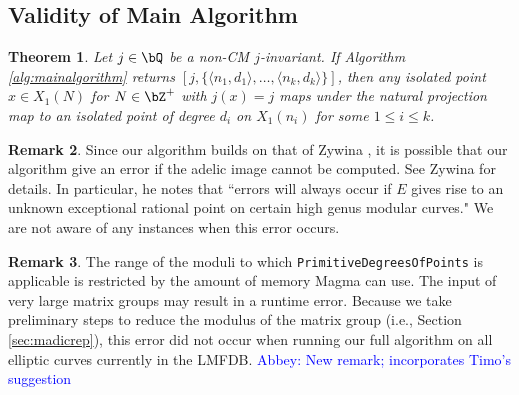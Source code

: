 \documentclass[11pt,reqno]{amsart}
\theoremstyle{plain}
\newtheorem{theorem}{Theorem}%
\theoremstyle{definition}
\newtheorem{remark}[theorem]{Remark}
\newcommand{\Q}{\bQ}
\newcommand{\Z}{\bZ}
\newcommand{\abbey}[1]{\textcolor{blue}{Abbey: #1}}
\begin{document}
\subsection{Validity of Main Algorithm}
\label{sec:proofvalidity}
\begin{theorem}\label{thm:validity_main_algorithm}
Let $j\in\Q$ be a non-CM $j$-invariant. If Algorithm \ref{alg:mainalgorithm} returns $[j,\{\langle n_1,d_1\rangle, \dots, \langle n_k,d_k\rangle \}]$, then any isolated point $x\in X_1(N)$ for $N \in \Z^+$ with $j(x)=j$ maps under the natural projection map to an isolated point of degree $d_i$ on $X_1(n_i)$ for some  $1 \leq i \leq k$.
\end{theorem}

\begin{remark}
Since our algorithm builds on that of Zywina \cite{ZywinaAlgorithm}, it is possible that our algorithm give an error if the adelic image cannot be computed. See Zywina \cite{ZywinaImagesGit} for details. In particular, he notes that ``errors will always occur if $E$ gives rise to an unknown exceptional rational point on certain high genus modular curves." We are not aware of any instances when this error occurs.
\end{remark}

\begin{remark}
The range of the moduli to which \texttt{PrimitiveDegreesOfPoints} is applicable is restricted by the amount of memory Magma can use. The input of very large matrix groups may result in a runtime error. Because we take preliminary steps to reduce the modulus of the matrix group (i.e., Section \ref{sec:madicrep}), this error did not occur when running our full algorithm on all elliptic curves currently in the LMFDB. \abbey{New remark; incorporates Timo's suggestion}
\end{remark}
\end{document}
